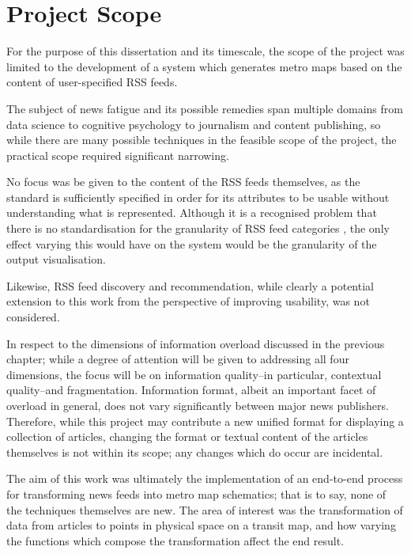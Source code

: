 \section{Project Scope}

For the purpose of this dissertation and its timescale, the scope of the project was limited to the development of a system which generates metro maps based on the content of user-specified RSS feeds.

The subject of news fatigue and its possible remedies span multiple domains from data science to cognitive psychology to journalism and content publishing, so while there are many possible techniques in the feasible scope of the project, the practical scope required significant narrowing.

No focus was be given to the content of the RSS feeds themselves, as the standard is sufficiently specified in order for its attributes to be usable without understanding what is represented. Although it is a recognised problem that there is no standardisation for the granularity of RSS feed categories \citep{PersonalNewsRss}, the only effect varying this would have on the system would be the granularity of the output visualisation.

Likewise, RSS feed discovery and recommendation, while clearly a potential extension to this work from the perspective of improving usability, was not considered.

In respect to the dimensions of information overload \citep{TowardsAnOptimalResolutionToInformationOverload} discussed in the previous chapter; while a degree of attention will be given to addressing all four dimensions, the focus will be on information quality--in particular, contextual quality--and fragmentation. Information format, albeit an important facet of overload in general, does not vary significantly between major news publishers. Therefore, while this project may contribute a new unified format for displaying a collection of articles, changing the format or textual content of the articles themselves is not within its scope; any changes which do occur are incidental.

The aim of this work was ultimately the implementation of an end-to-end process for transforming news feeds into metro map schematics; that is to say, none of the techniques themselves are new. The area of interest was the transformation of data from articles to points in physical space on a transit map, and how varying the functions which compose the transformation affect the end result.

